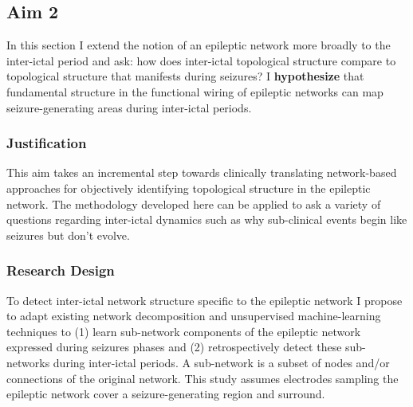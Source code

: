 \subsection{Aim 2}
\label{rsappr:aim2}
In this section I extend the notion of an epileptic network more broadly to the inter-ictal period and ask: how does inter-ictal topological structure compare to topological structure that manifests during seizures? I \textbf{hypothesize} that fundamental structure in the functional wiring of epileptic networks can map seizure-generating areas during inter-ictal periods.

\subsubsection{Justification}
This aim takes an incremental step towards clinically translating network-based approaches for objectively identifying topological structure in the epileptic network. The methodology developed here can be applied to ask a variety of questions regarding inter-ictal dynamics such as why sub-clinical events begin like seizures but don't evolve.

\subsubsection{Research Design}
To detect inter-ictal network structure specific to the epileptic network I propose to adapt existing network decomposition and unsupervised machine-learning techniques to (1) learn sub-network components of the epileptic network expressed during seizures phases and (2) retrospectively detect these sub-networks during inter-ictal periods. A sub-network is a subset of nodes and/or connections of the original network. This study assumes electrodes sampling the epileptic network cover a seizure-generating region and surround.  


